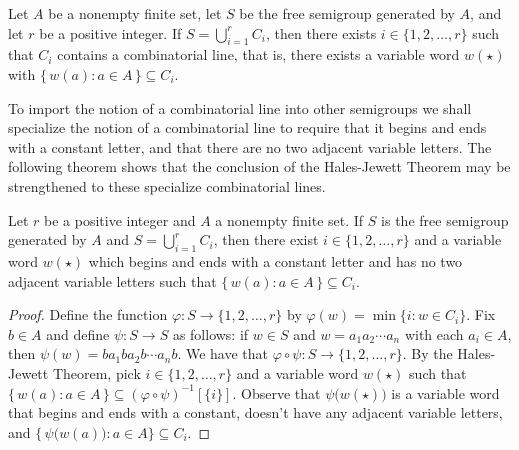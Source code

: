 \begin{hj}
  Let $A$ be a nonempty finite set, let $S$ be the free semigroup generated by $A$, and let $r$ be a positive integer.
  If $S = \bigcup_{i=1}^r C_i$, then there exists $i \in \{1, 2, \ldots, r\}$ such that $C_i$ contains a combinatorial line, that is, there exists a variable word $w(\star)$ with $\bigl\{\, w(a) : a \in A \,\bigr\} \subseteq C_i$.
\end{hj}

To import the notion of a combinatorial line into other semigroups we shall specialize the notion of a combinatorial line to require that it begins and ends with a constant letter, and that there are no two adjacent variable letters.
The following theorem shows that the conclusion of the Hales-Jewett Theorem may be strengthened to these specialize combinatorial lines.  

\begin{thm}
  \label{thm:special-hj}
  Let $r$ be a positive integer and $A$ a nonempty finite set.
  If $S$ is the free semigroup generated by $A$ and $S = \bigcup_{i=1}^r C_i$, then there exist $i \in \{1, 2, \ldots, r\}$ and a variable word $w(\star)$ which begins and ends with a constant letter and has no two adjacent variable letters such that $\bigl\{\, w(a) : a \in A \,\bigr\} \subseteq C_i$.
\end{thm}
\begin{proof}
  Define the function $\varphi \colon S \to \{1, 2, \ldots, r\}$ by $\varphi(w) = \min\{i : w \in C_i\}$. 
  Fix $b \in A$ and define $\psi \colon S \to S$ as follows: if $w \in S$ and $w = a_1a_2 \cdots a_n$ with each $a_i \in A$, then $\psi(w) = ba_1ba_2b\cdots a_nb$.
  We have that $\varphi \circ \psi \colon S \to \{1, 2, \ldots, r\}$.
  By the Hales-Jewett Theorem, pick $i \in \{1, 2, \ldots, r\}$ and a variable word $w(\star)$ such that $\{\, w(a) : a \in A \,\} \subseteq (\varphi \circ \psi)^{-1}[\{i\}]$.
  Observe that $\psi\bigl(w(\star)\bigr)$ is a variable word that begins and ends with a constant, doesn't have any adjacent variable letters, and $\{\, \psi\bigl(w(a)\bigr) : a \in A \} \subseteq C_i$.
\end{proof}

